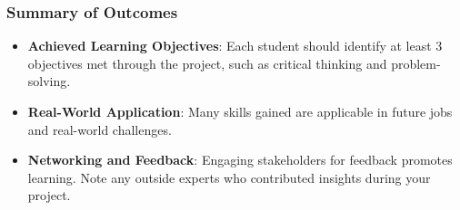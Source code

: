 \documentclass[aspectratio=169]{beamer}
\begin{document}
\begin{frame}[fragile]
    \frametitle{Summary of Outcomes}
    
    \begin{itemize}
        \item \textbf{Achieved Learning Objectives}:
        Each student should identify at least 3 objectives met through the project, such as critical thinking and problem-solving.
        
        \item \textbf{Real-World Application}:
        Many skills gained are applicable in future jobs and real-world challenges.
        
        \item \textbf{Networking and Feedback}:
        Engaging stakeholders for feedback promotes learning. Note any outside experts who contributed insights during your project.
    \end{itemize}
\end{frame}
\end{document}
